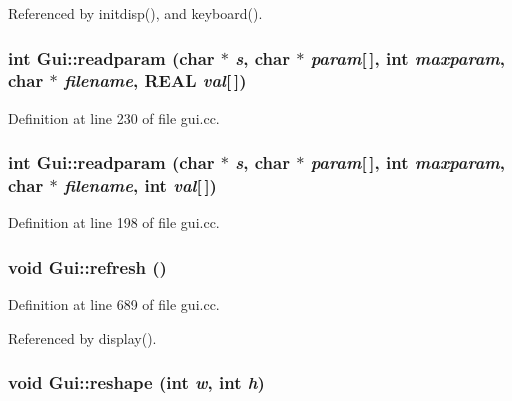Referenced by initdisp(), and keyboard().\hypertarget{namespaceGui_2dfb340ad9e98cedbf5e4ef8022da1b9}{
\subsubsection[{readparam}]{\setlength{\rightskip}{0pt plus 5cm}int Gui::readparam (char $\ast$ {\em s}, \/  char $\ast$ {\em param}\mbox{[}$\,$\mbox{]}, \/  int {\em maxparam}, \/  char $\ast$ {\em filename}, \/  REAL {\em val}\mbox{[}$\,$\mbox{]})}}
\label{namespaceGui_2dfb340ad9e98cedbf5e4ef8022da1b9}




Definition at line 230 of file gui.cc.\hypertarget{namespaceGui_c367306deffcdaf711e6dfe0452b0b76}{
\subsubsection[{readparam}]{\setlength{\rightskip}{0pt plus 5cm}int Gui::readparam (char $\ast$ {\em s}, \/  char $\ast$ {\em param}\mbox{[}$\,$\mbox{]}, \/  int {\em maxparam}, \/  char $\ast$ {\em filename}, \/  int {\em val}\mbox{[}$\,$\mbox{]})}}
\label{namespaceGui_c367306deffcdaf711e6dfe0452b0b76}




Definition at line 198 of file gui.cc.\hypertarget{namespaceGui_5b94ce6e857635065a0c2053b95529b5}{
\subsubsection[{refresh}]{\setlength{\rightskip}{0pt plus 5cm}void Gui::refresh ()}}
\label{namespaceGui_5b94ce6e857635065a0c2053b95529b5}




Definition at line 689 of file gui.cc.

Referenced by display().\hypertarget{namespaceGui_fe299b50153348bf53b6910e74098c42}{
\subsubsection[{reshape}]{\setlength{\rightskip}{0pt plus 5cm}void Gui::reshape (int {\em w}, \/  int {\em h})}}
\label{namespaceGui_fe299b50153348bf53b6910e74098c42}




